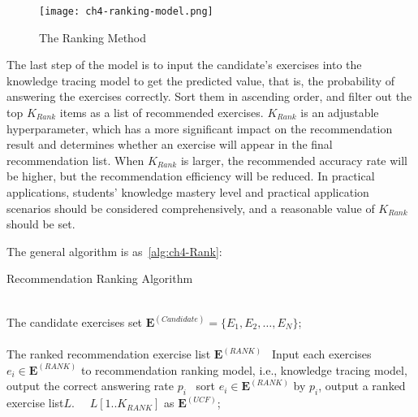 \begin{figure}[htbp!]
  \centering
  \texttt{[image: ch4-ranking-model.png]}
  \caption{The Ranking Method}\label{fig:ch4-ranking-1}
\end{figure}


The last step of the model is to input the candidate's exercises into the knowledge tracing model to get the predicted value, that is, the probability of answering the exercises correctly. Sort them in ascending order, and filter out the top \(K_{Rank}\) items as a list of recommended exercises. \(K_{Rank}\) is an adjustable hyperparameter, which has a more significant impact on the recommendation result and determines whether an exercise will appear in the final recommendation list. When \(K_{Rank}\) is larger, the recommended accuracy rate will be higher, but the recommendation efficiency will be reduced. In practical applications, students' knowledge mastery level and practical application scenarios should be considered comprehensively, and a reasonable value of \(K_{Rank}\) should be set.

The general algorithm is as~\ref{alg:ch4-Rank}:
\begin{algorithm}[htbp!]
  \caption{Recommendation Ranking Algorithm}\label{alg:ch4-Rank}
  \begin{algorithmic}
    \REQUIRE~~\\
    The candidate exercises set \(\mathbf{E}^{(Candidate)}=\{E_1,E_2,\ldots,E_N\} \); \\
    \ENSURE~~\\ %
    The ranked recommendation exercise list \(\mathbf{E}^{(RANK)} \)
    \STATE~Input each exercises \(e_i \in \mathbf{E}^{(RANK)} \) to recommendation ranking model, i.e., knowledge tracing model, output the correct answering rate \(p_i\)
    \STATE~sort \(e_i \in \mathbf{E}^{(RANK)} \) by \(p_i\), output a ranked exercise list\(L\).
    \RETURN~~\(L[1..K_{RANK}]\) as \(\mathbf{E}^{(UCF)} \); %
  \end{algorithmic}
\end{algorithm}

